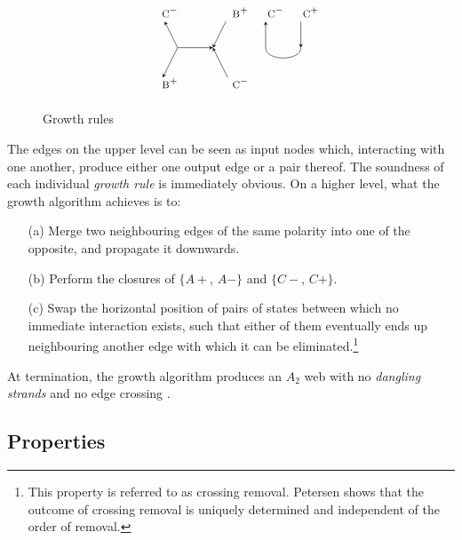 \documentclass[nonatbib,numbers,10pt]{sigplanconf}
\begin{document}
\begin{figure}[h!]
\[\begin{tikzpicture}
\node (i33) at (7,-5) {$\textsc{\small C}^-$};
\node (ii33) at (9,-5) {$\textsc{\small B}^+$};
\node (d33) at (7.5,-6) {};
\node (dd33) at (8.5,-6) {};
\node (o33) at (7,-7) {$\textsc{\small B}^+$};
\node (oo33) at (9,-7) {$\textsc{\small C}^-$};
\draw[<-,>=stealth] (i33) -- (d33.center);
\draw[->,>=stealth] (ii33) -- (dd33.center);
\draw[->,>=stealth] (d33.center) -- (dd33.center);
\draw[->,>=stealth, shorten >=5pt] (d33.center) -- (o33.center);
\draw[<-,>=stealth, shorten >=5pt] (dd33.center) -- (oo33.center);

\node (i34) at (10,-5) {$\textsc{\small C}^-$};
\node (ii34) at (11,-5) {$\textsc{\small C}^+$};
\node (d34) at (10,-6) {};
\node (dd34) at (11,-6) {};
\draw[<-,>=stealth] (i34) -- (d34.center);
\draw[->,>=stealth] (ii34) -- (dd34.center);
\draw (d34.center) edge [-,>=stealth,bend right=90] (dd34.center);

\end{tikzpicture}
\]
\caption{Growth rules}
\label{fig:rules}
\end{figure}

The edges on the upper level can be seen as input nodes which, interacting with one another, produce either one output edge or a pair thereof. The soundness of each individual \textit{growth rule} is immediately obvious. On a higher level, what the growth algorithm achieves is to:
\begin{enumerate}
\item[(a)] Merge two neighbouring edges of the same polarity into one of the opposite, and propagate it downwards.
\item[(b)] Perform the closures of $\{A+$, $A-\}$ and $\{C-$, $C+\}$.
\item[(c)] Swap the horizontal position of pairs of states between which no immediate interaction exists, such that either of them eventually ends up neighbouring another edge with which it can be eliminated.\footnote{This property is referred to as crossing removal. Petersen\cite{petersen} shows that the outcome of crossing removal is uniquely determined and independent of the order of removal.}
\end{enumerate}

At termination, the growth algorithm produces an $A_2$ web with no \textit{dangling strands} and no edge crossing \cite{petersen}.
\subsection{Properties}
\end{document}
